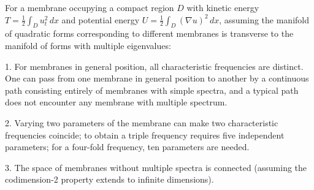 For a membrane occupying a compact region $D$ with kinetic energy $T = \frac{1}{2} \int_D u_t^2 \, dx$ and potential energy $U = \frac{1}{2} \int_D (\nabla u)^2 \, dx$, assuming the manifold of quadratic forms corresponding to different membranes is transverse to the manifold of forms with multiple eigenvalues:

1. For membranes in general position, all characteristic frequencies are distinct. One can pass from one membrane in general position to another by a continuous path consisting entirely of membranes with simple spectra, and a typical path does not encounter any membrane with multiple spectrum.

2. Varying two parameters of the membrane can make two characteristic frequencies coincide; to obtain a triple frequency requires five independent parameters; for a four-fold frequency, ten parameters are needed.

3. The space of membranes without multiple spectra is connected (assuming the codimension-2 property extends to infinite dimensions).
